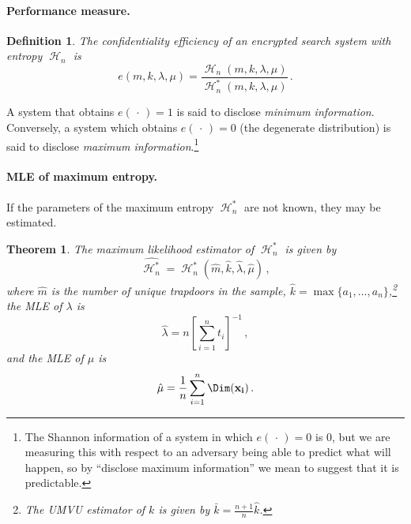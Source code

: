 \documentclass[final,11pt]{article}
\newcommand{\entropy}{\operatorname{\mathcal{H}}}
\renewcommand{\vec}[1]{\boldsymbol{\mathbf{#1}}}
\numberwithin{equation}{section}
\theoremstyle{plain}
\newtheorem{theorem}{Theorem}[section]
\newtheorem{definition}{Definition}[section]
\theoremstyle{remark}
\begin{document}
\paragraph{Performance measure.}
\begin{definition}
The \emph{confidentiality efficiency} of an encrypted search system with entropy $\entropy_n$ is
\begin{equation}
    e(m,k,\lambda,\mu)=\frac{\entropy_n\left(m, k, \lambda, \mu\right)}{\entropy_n^*(m, k, \lambda, \mu)}\,.
\end{equation}
\end{definition}

A system that obtains $e(\,\cdot\,) = 1$ is said to disclose \emph{minimum information}. Conversely, a system which obtains $e(\,\cdot\,) = 0$ (the degenerate distribution) is said to disclose \emph{maximum information}.\footnote{The Shannon information of a system in which $e(\,\cdot\,) = 0$ is $0$, but we are measuring this with respect to an adversary being able to predict what will happen, so by ``disclose maximum information'' we mean to suggest that it is predictable.}

\paragraph{MLE of maximum entropy.}
If the parameters of the maximum entropy $\entropy_n^*$ are not known, they may be estimated.
\begin{theorem}
The maximum likelihood estimator of $\entropy_n^*$ is given by
\begin{equation}
\label{eq:maxentropy_est}
    \hat{\entropy_n^*} = \entropy_n^*\left(\hat{m}, \hat{k}, \hat{\lambda}, \hat{\mu}\right)\,,
\end{equation}
where $\hat{m}$ is the number of unique trapdoors in the sample, $\hat{k} = \max\{a_1,\ldots,a_n\}$,\footnote{The UMVU estimator of $k$ is given by $\bar{k} = \frac{n + 1}{n} \hat{k}$.} the MLE of $\lambda$ is
\begin{equation}
\label{eq:umvu_lambda_geometric}
    \hat{\lambda} = n \left[\sum_{i=1}^{n} t_i\right]^{-1}\,,
\end{equation}
and the MLE of $\mu$ is
\begin{equation}
    \hat{\mu} = \frac{1}{n} \sum_{i=1}^{n} \Dim(\vec{x_i})\,.
\end{equation}
\end{theorem}
\end{document}
